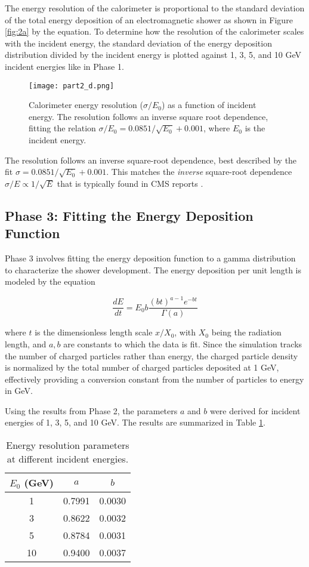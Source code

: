 \documentclass[twocolumn]{aastex631}
\begin{document}
The energy resolution of the calorimeter is proportional to the standard
deviation of the total energy deposition of an electromagnetic shower as shown
in Figure \ref{fig:2a} by the equation. To determine how the resolution of the calorimeter
scales with the incident energy, the standard deviation of the energy deposition
distribution divided by the incident energy is plotted against 1, 3, 5, and 10
GeV incident energies like in Phase 1. 

\begin{figure}[htp]
  \centering
    \texttt{[image: part2\_d.png]}
    \caption{Calorimeter energy resolution ($\sigma/E_0$) as a function of incident energy.
        The resolution follows an inverse square root dependence, fitting the relation
        $\sigma/E_0 = 0.085 1/\sqrt{E_0} + 0.001$, where  $E_0$ is the incident
    energy.}
    \label{fig:2d} 
\end{figure}


The resolution follows an inverse square-root dependence, best described by the fit
$\sigma = 0.085 1/\sqrt{E_0} + 0.001$. This matches the
\textit{inverse} square-root dependence $\sigma / E \propto 1/\sqrt{E}$ that is
typically found in CMS reports \citep{CMS2024arXiv2403.15518}. 

\subsection{Phase 3: Fitting the Energy Deposition Function} 

Phase 3 involves fitting the energy deposition function to a gamma distribution
to characterize the shower development. The energy deposition per unit length is
modeled by the equation 

\[ \frac{dE}{dt} = E_0 b \frac{(bt)^{a-1} e^{-bt}}{\Gamma(a)} \] 

where $t$ is the dimensionless length scale $x/X_0$, with $X_0$ being the
radiation length, and $a,b$ are constants to which the data is fit. Since the
simulation tracks the number of charged particles rather than energy, the
charged particle density is normalized by the total number of charged particles
deposited at 1 GeV, effectively providing a conversion constant from the number
of particles to energy in GeV. 

Using the results from Phase 2, the parameters $a$ and $b$ were derived for
incident energies of 1, 3, 5, and 10 GeV. The results are summarized in Table
\ref{tab:3}.


\begin{table}[htp]
\centering
\begin{tabular}{c||c|c}
$E_0$ (GeV) & $a$    & $b$    \\
\hline
1           & 0.7991 & 0.0030 \\
3           & 0.8622 & 0.0032 \\
5           & 0.8784 & 0.0031 \\
10          & 0.9400 & 0.0037 \\
\end{tabular}
\caption{Energy resolution parameters at different incident energies.}
\label{tab:3}
\end{table}
\end{document}
